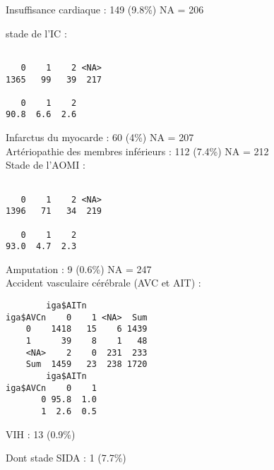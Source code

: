 \documentclass[11pt,a4paper]{article}\usepackage[]{graphicx}\usepackage[]{color}
\makeatletter
\newenvironment{kframe}{%
 \def\at@end@of@kframe{}%
 \ifinner\ifhmode%
  \def\at@end@of@kframe{\end{minipage}}%
  \begin{minipage}{\columnwidth}%
 \fi\fi%
 \def\FrameCommand##1{\hskip\@totalleftmargin \hskip-\fboxsep
 \colorbox{shadecolor}{##1}\hskip-\fboxsep
     \hskip-\linewidth \hskip-\@totalleftmargin \hskip\columnwidth}%
 \MakeFramed {\advance\hsize-\width
   \@totalleftmargin\z@ \linewidth\hsize
   \@setminipage}}%
 {\par\unskip\endMakeFramed%
 \at@end@of@kframe}
\newenvironment{knitrout}{}{} %
\makeatother
\begin{document}
Insuffisance cardiaque : 149 (9.8\%) NA = 206

stade de l’IC :

\begin{knitrout}
\color{fgcolor}\begin{kframe}
\begin{verbatim}

   0    1    2 <NA> 
1365   99   39  217 

   0    1    2 
90.8  6.6  2.6 
\end{verbatim}
\end{kframe}
\end{knitrout}

Infarctus du myocarde : 60 (4\%) NA = 207
~\\

Artériopathie des membres inférieurs : 112 (7.4\%) NA = 212
~\\

Stade de l’AOMI : 

\begin{knitrout}
\color{fgcolor}\begin{kframe}
\begin{verbatim}

   0    1    2 <NA> 
1396   71   34  219 

   0    1    2 
93.0  4.7  2.3 
\end{verbatim}
\end{kframe}
\end{knitrout}

Amputation : 9 (0.6\%) NA = 247
~\\

Accident vasculaire cérébrale (AVC et AIT) :

\begin{knitrout}
\color{fgcolor}\begin{kframe}
\begin{verbatim}
        iga$AITn
iga$AVCn    0    1 <NA>  Sum
    0    1418   15    6 1439
    1      39    8    1   48
    <NA>    2    0  231  233
    Sum  1459   23  238 1720
        iga$AITn
iga$AVCn    0    1
       0 95.8  1.0
       1  2.6  0.5
\end{verbatim}
\end{kframe}
\end{knitrout}

VIH : 13 (0.9\%)

Dont stade SIDA : 1 (7.7\%)
~\\
\end{document}
